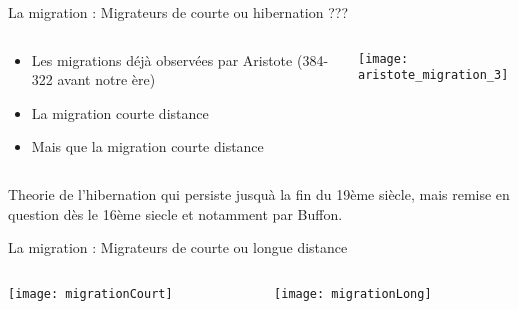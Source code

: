 \message{ !name(cours_DIE_ONIRIS_Suivi_populations_oiseaux.tex)}\documentclass[10pt]{beamer}
\begin{document}
\begin{frame}{La migration :  Migrateurs de courte ou hibernation ???}
   \begin{columns}[c]
    \begin{column}[c]{0.3\textwidth}
      \begin{itemize}
      \item Les migrations déjà observées par Aristote (384-322
        avant notre ère)
      \item La migration courte distance
      \item Mais que la migration courte distance
      \end{itemize}
    \end{column}
    \begin{column}[c]{0.7\textwidth}
      \begin{center}
         \texttt{[image: aristote\_migration\_3]}
      \end{center}
    \end{column}
  \end{columns}
  \begin{center}
    Theorie de l'hibernation qui persiste jusquà la fin du 19ème
    siècle, mais remise en question dès le 16ème siecle et notamment par Buffon. 
  \end{center}
\end{frame}


\begin{frame}{La migration : Migrateurs de courte ou longue distance}
 \begin{columns}[c]
    \begin{column}[c]{0.5\textwidth}
      \begin{center}
       \texttt{[image: migrationCourt]} 
      \end{center}
    \end{column}
    \begin{column}[c]{0.5\textwidth}
      \texttt{[image: migrationLong]} 
        \end{column}
  \end{columns}
\end{frame}
\end{document}
